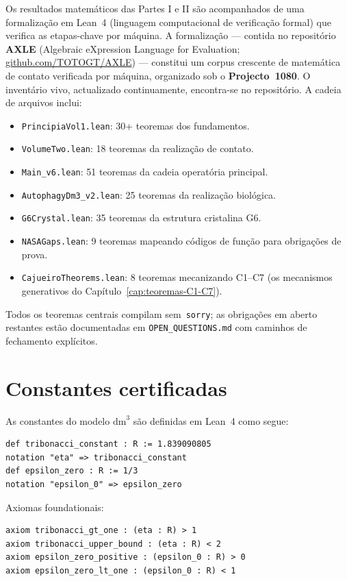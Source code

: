 \documentclass[12pt,a4paper,twoside]{book}
\theoremstyle{plain}
\theoremstyle{definition}
\theoremstyle{definition}
\newcommand{\dm}{\mathrm{dm}^{3}}
\begin{document}
Os resultados matemáticos das Partes I e II são acompanhados de uma
formalização em Lean~4 (linguagem computacional de verificação formal)
que verifica as etapas-chave por máquina.
A formalização --- contida no repositório \textbf{AXLE}
(Algebraic eXpression Language for Evaluation;
\href{https://github.com/TOTOGT/AXLE}{github.com/TOTOGT/AXLE}) ---
constitui um corpus crescente de matemática de contato verificada por
máquina, organizado sob o \textbf{Projecto~1080}. O inventário vivo,
actualizado continuamente, encontra-se no repositório.
A cadeia de arquivos inclui:
\begin{itemize}
  \item \texttt{PrincipiaVol1.lean}: 30+ teoremas dos fundamentos.
  \item \texttt{VolumeTwo.lean}: 18 teoremas da realização de contato.
  \item \texttt{Main\_v6.lean}: 51 teoremas da cadeia operatória principal.
  \item \texttt{AutophagyDm3\_v2.lean}: 25 teoremas da realização biológica.
  \item \texttt{G6Crystal.lean}: 35 teoremas da estrutura cristalina G6.
  \item \texttt{NASAGaps.lean}: 9 teoremas mapeando códigos de função
        para obrigações de prova.
  \item \texttt{CajueiroTheorems.lean}: 8 teoremas mecanizando C1--C7 (os
        mecanismos generativos do Capítulo~\ref{cap:teoremas-C1-C7}).
\end{itemize}
Todos os teoremas centrais compilam sem~\texttt{sorry}; as obrigações
em aberto restantes estão documentadas em \texttt{OPEN\_QUESTIONS.md}
com caminhos de fechamento explícitos.

\section{Constantes certificadas}

As constantes do modelo $\dm$ são definidas em Lean~4 como segue:

\begin{lstlisting}[language=lean]
def tribonacci_constant : R := 1.839090805
notation "eta" => tribonacci_constant
def epsilon_zero : R := 1/3
notation "epsilon_0" => epsilon_zero
\end{lstlisting}

Axiomas foundationais:

\begin{lstlisting}[language=lean]
axiom tribonacci_gt_one : (eta : R) > 1
axiom tribonacci_upper_bound : (eta : R) < 2
axiom epsilon_zero_positive : (epsilon_0 : R) > 0
axiom epsilon_zero_lt_one : (epsilon_0 : R) < 1
\end{lstlisting}
\end{document}
